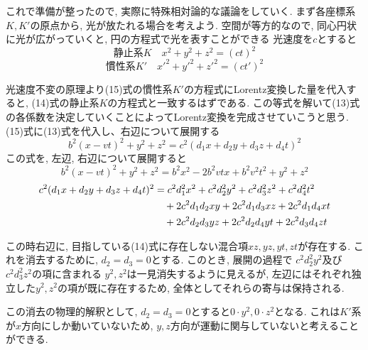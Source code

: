 \documentclass{ltjsarticle}
\begin{document}
これで準備が整ったので, 実際に特殊相対論的な議論をしていく. 
まず各座標系$K, K'$の原点から, 光が放たれる場合を考えよう. 
空間が等方的なので, 同心円状に光が広がっていくと, 円の方程式で光を表すことができる
光速度を$c$とすると
\begin{equation}
  静止系K \quad x^2 + y^2 + z^2 = (ct)^2 
\end{equation}
\begin{equation}
  慣性系K' \quad x'^2 + y'^2 + z'^2 = (ct')^2
\end{equation}

光速度不変の原理より(15)式の慣性系$K'$の方程式にLorentz変換した量を代入すると, (14)式の静止系$K$の方程式と一致するはずである.
この等式を解いて(13)式の各係数を決定していくことによってLorentz変換を完成させていこうと思う. 
(15)式に(13)式を代入し、右辺について展開する
\begin{equation}
  b^2(x - vt)^2 + y^2 + z^2 = c^2(d_1 x + d_2 y + d_3 z + d_4 t)^2
\end{equation}
この式を, 左辺, 右辺について展開すると
\begin{equation}
  b^2(x - vt)^2 + y^2 + z^2 =
  b^2 x^2 -2b^2 vtx + b^2 v^2 t^2 + y^2 +z^2
\end{equation}
\begin{align}
c^2(d_1 x + d_2 y + d_3 z + d_4 t)^2
&= c^2 d_1^2 x^2 + c^2 d_2^2 y^2 + c^2 d_3^2 z^2 + c^2 d_4^2 t^2 \notag\\
&\quad + 2c^2 d_1 d_2 xy + 2c^2 d_1 d_3 xz + 2c^2 d_1 d_4 xt \notag\\
&\quad + 2c^2 d_2 d_3 yz + 2c^2 d_2 d_4 yt + 2c^2 d_3 d_4 zt
\end{align}

この時右辺に, 目指している(14)式に存在しない混合項$xz, yz, yt, zt$が存在する. 
これを消去するために, $d_2 = d_3 = 0$とする. 
このとき, 展開の過程で $c^2 d_2^2 y^2$及び$c^2 d_3^2 z^2$の項に含まれる $y^2, z^2$は一見消失するように見えるが, 
左辺にはそれぞれ独立した$y^2, z^2$の項が既に存在するため, 全体としてそれらの寄与は保持される. 

この消去の物理的解釈として, $d_2 = d_3 = 0$とすると$0 \cdot y^2, 0 \cdot z^2$となる. 
これは$K'$系が$x$方向にしか動いていないため, $y, z$方向が運動に関与していないと考えることができる. 
\end{document}
